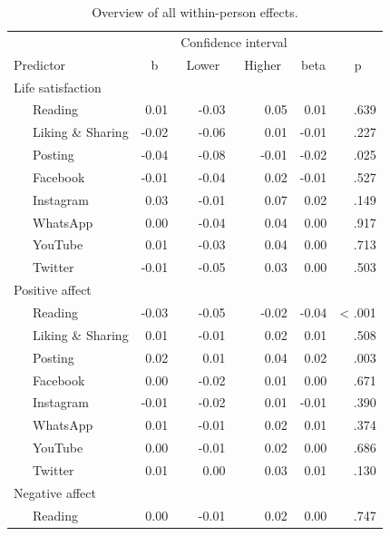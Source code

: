 \documentclass[
  man,mask,floatsintext]{apa7}
\begin{document}
\begin{table}[tbp]

\begin{center}
\begin{threeparttable}

\caption{\label{tab:tab-within}Overview of all within-person effects.}

\footnotesize{

\begin{tabular}{lrrrrr}
\toprule
 &  & \multicolumn{2}{c}{Confidence interval}  &  &\\
\cmidrule(r){3-4}
Predictor & \multicolumn{1}{c}{b} & \multicolumn{1}{c}{Lower} & \multicolumn{1}{c}{Higher} & \multicolumn{1}{c}{beta} & \multicolumn{1}{c}{p}\\
\midrule
Life satisfaction &  &  &  &  & \\
\ \ \ Reading & 0.01 & -0.03 & 0.05 & 0.01 & .639\\
\ \ \ Liking \& Sharing & -0.02 & -0.06 & 0.01 & -0.01 & .227\\
\ \ \ Posting & -0.04 & -0.08 & -0.01 & -0.02 & .025\\
\ \ \ Facebook & -0.01 & -0.04 & 0.02 & -0.01 & .527\\
\ \ \ Instagram & 0.03 & -0.01 & 0.07 & 0.02 & .149\\
\ \ \ WhatsApp & 0.00 & -0.04 & 0.04 & 0.00 & .917\\
\ \ \ YouTube & 0.01 & -0.03 & 0.04 & 0.00 & .713\\
\ \ \ Twitter & -0.01 & -0.05 & 0.03 & 0.00 & .503\\
Positive affect &  &  &  &  & \\
\ \ \ Reading & -0.03 & -0.05 & -0.02 & -0.04 & < .001\\
\ \ \ Liking \& Sharing & 0.01 & -0.01 & 0.02 & 0.01 & .508\\
\ \ \ Posting & 0.02 & 0.01 & 0.04 & 0.02 & .003\\
\ \ \ Facebook & 0.00 & -0.02 & 0.01 & 0.00 & .671\\
\ \ \ Instagram & -0.01 & -0.02 & 0.01 & -0.01 & .390\\
\ \ \ WhatsApp & 0.01 & -0.01 & 0.02 & 0.01 & .374\\
\ \ \ YouTube & 0.00 & -0.01 & 0.02 & 0.00 & .686\\
\ \ \ Twitter & 0.01 & 0.00 & 0.03 & 0.01 & .130\\
Negative affect &  &  &  &  & \\
\ \ \ Reading & 0.00 & -0.01 & 0.02 & 0.00 & .747\\

\end{tabular}}
\end{threeparttable}
\end{center}
\end{table}
\end{document}
